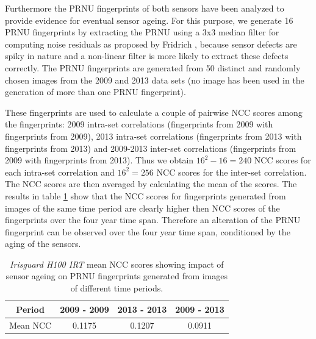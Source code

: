 \documentclass[10pt,twocolumn,letterpaper]{article}
\begin{document}
%

Furthermore the PRNU fingerprints of both sensors have been analyzed to provide evidence for eventual sensor ageing. For this purpose, we generate 16 PRNU fingerprints  by extracting the PRNU using a 3x3 median filter for computing noise residuals as proposed by Fridrich \cite{fridrich}, because sensor defects are spiky in nature and a non-linear filter is more likely to extract these defects correctly. The PRNU fingerprints are generated from 50 distinct and randomly chosen images from the 2009 and 2013 data sets (no image has been used in the generation of more than one PRNU fingerprint). 

These fingerprints are used to calculate a couple of pairwise NCC scores among the fingerprints: 2009 intra-set correlations (fingerprints from 2009 with fingerprints from 2009), 2013 intra-set correlations (fingerprints from 2013 with fingerprints from 2013) and 2009-2013 inter-set correlations (fingerprints from 2009 with fingerprints from 2013). Thus we obtain $16^{2}-16 = 240$ NCC scores for each intra-set correlation and $16^2 = 256$ NCC scores for the inter-set correlation. The NCC scores are then averaged by calculating the mean of the scores.
The results in table \ref{table:prnu_fp_corr} show that the NCC scores for fingerprints generated from images of the same time period are clearly higher then NCC scores of the fingerprints over the four year time span. Therefore an alteration of the PRNU fingerprint can be observed over the four year time span, conditioned by the aging of the sensors.
 
 \begin{table} [hbt]
 \begin{center}
	\begin{tabular}{ c | c | c | c }
		   Period & 2009 - 2009 & 2013 - 2013 & 2009 - 2013 \\
		  \hline
			Mean NCC & 0.1175 & 0.1207  & 0.0911 
	\end{tabular}
	\vspace{2mm}
        \caption{\emph{Irisguard H100 IRT} mean NCC scores showing impact of sensor ageing on PRNU fingerprints generated from images of different time periods.}
    \label{table:prnu_fp_corr}
\end{center} 
\end{table}
\end{document}
